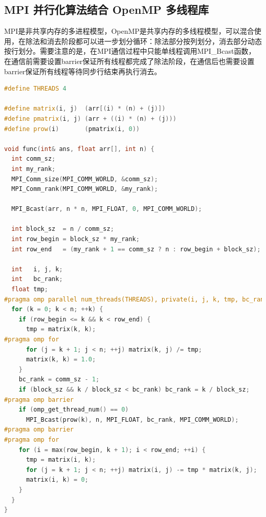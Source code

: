\documentclass[a4paper]{article}
\begin{document}
\subsection{MPI 并行化算法结合 OpenMP 多线程库}
MPI是非共享内存的多进程模型，OpenMP是共享内存的多线程模型，可以混合使用，在除法和消去阶段都可以进一步划分循环：除法部分按列划分，消去部分动态按行划分。需要注意的是，在MPI通信过程中只能单线程调用MPI\_Bcast函数，在通信前需要设置barrier保证所有线程都完成了除法阶段，在通信后也需要设置barrier保证所有线程等待同步行结束再执行消去。
\begin{lstlisting}[frame=trbl,language={C++}]
#define THREADS 4

#define matrix(i, j)  (arr[(i) * (n) + (j)])
#define pmatrix(i, j) (arr + ((i) * (n) + (j)))
#define prow(i)       (pmatrix(i, 0))

void func(int& ans, float arr[], int n) {
  int comm_sz;
  int my_rank;
  MPI_Comm_size(MPI_COMM_WORLD, &comm_sz);
  MPI_Comm_rank(MPI_COMM_WORLD, &my_rank);

  MPI_Bcast(arr, n * n, MPI_FLOAT, 0, MPI_COMM_WORLD);

  int block_sz  = n / comm_sz;
  int row_begin = block_sz * my_rank;
  int row_end   = (my_rank + 1 == comm_sz ? n : row_begin + block_sz);

  int   i, j, k;
  int   bc_rank;
  float tmp;
#pragma omp parallel num_threads(THREADS), private(i, j, k, tmp, bc_rank)
  for (k = 0; k < n; ++k) {
    if (row_begin <= k && k < row_end) {
      tmp = matrix(k, k);
#pragma omp for
      for (j = k + 1; j < n; ++j) matrix(k, j) /= tmp;
      matrix(k, k) = 1.0;
    }
    bc_rank = comm_sz - 1;
    if (block_sz && k / block_sz < bc_rank) bc_rank = k / block_sz;
#pragma omp barrier
    if (omp_get_thread_num() == 0)
      MPI_Bcast(prow(k), n, MPI_FLOAT, bc_rank, MPI_COMM_WORLD);
#pragma omp barrier
#pragma omp for
    for (i = max(row_begin, k + 1); i < row_end; ++i) {
      tmp = matrix(i, k);
      for (j = k + 1; j < n; ++j) matrix(i, j) -= tmp * matrix(k, j);
      matrix(i, k) = 0;
    }
  }
}
\end{lstlisting}
\end{document}
